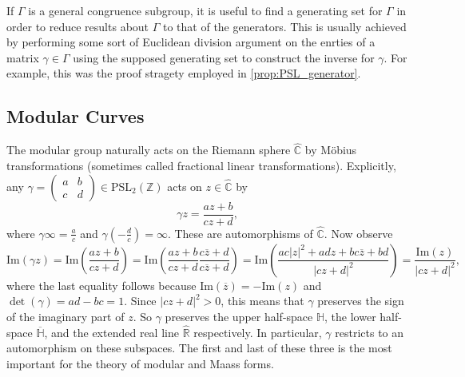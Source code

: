 \documentclass[12pt]{book}
\theoremstyle{definition}\newframedtheorem{method}{Method}
\newcommand{\PSL}{\mathrm{PSL}}
\newcommand{\Z}{\mathbb{Z}}
\newcommand{\R}{\mathbb{R}}
\newcommand{\C}{\mathbb{C}}
\renewcommand{\H}{\mathbb{H}}
\newcommand{\g}{\gamma}
\newcommand{\G}{\Gamma}
\newcommand{\<}{\langle}
\renewcommand{\>}{\rangle}
\newcommand{\conj}{\overline}
\renewcommand{\Im}{\mathrm{Im}}
\begin{document}
      If $\G$ is a general congruence subgroup, it is useful to find a generating set for $\G$ in order to reduce results about $\G$ to that of the generators. This is usually achieved by performing some sort of Euclidean division argument on the enrties of a matrix $\g \in \G$ using the supposed generating set to construct the inverse for $\g$. For example, this was the proof stragety employed in \cref{prop:PSL_generator}.
    \subsection*{Modular Curves}
      The modular group naturally acts on the Riemann sphere $\hat{\C}$ by M\"obius transformations (sometimes called fractional linear transformations). Explicitly, any $\g = \begin{pmatrix} a & b \\ c & d \end{pmatrix} \in \PSL_{2}(\Z)$ acts on $z \in \hat{\C}$ by
      \[
        \g z = \frac{az+b}{cz+d},
      \]
      where $\g \infty = \frac{a}{c}$ and $\g\left(-\frac{d}{c}\right) = \infty$. These are automorphisms of $\hat{\C}$. Now observe
      \[
        \Im(\g z) = \Im\left(\frac{az+b}{cz+d}\right) = \Im\left(\frac{az+b}{cz+d}\frac{c\conj{z}+d}{c\conj{z}+d}\right) = \Im\left(\frac{ac|z|^{2}+adz+bc\conj{z}+bd}{|cz+d|^{2}}\right) = \frac{\Im(z)}{|cz+d|^{2}},
      \]
      where the last equality follows because $\Im(\conj{z}) = -\Im(z)$ and $\det(\g) = ad-bc = 1$. Since $|cz+d|^{2} > 0$, this means that $\g$ preserves the sign of the imaginary part of $z$. So $\g$ preserves the upper half-space $\H$, the lower half-space $\conj{\H}$, and the extended real line $\hat{\R}$ respectively. In particular, $\g$ restricts to an automorphism on these subspaces. The first and last of these three is the most important for the theory of modular and Maass forms.
\end{document}
